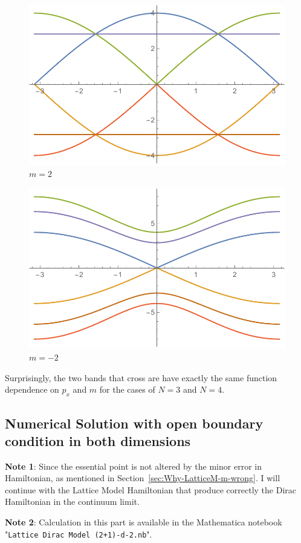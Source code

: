 \documentclass{article}
\begin{document}
\begin{figure}[H]
    \centering
    \includegraphics[width=0.6\linewidth]{pics/N8m2.pdf}
    \caption{$m=2$}
\end{figure}
\begin{figure}[H]
    \centering
    \includegraphics[width=0.6\linewidth]{pics/N8m-2.pdf}
    \caption{$m=-2$}
\end{figure}

Surprisingly, the two bands that cross are have exactly the same
function dependence on $p_x$ and $m$ for the cases of $N=3$ and
$N=4$.



{}


\printnomenclature

\subsection{Numerical Solution with open boundary condition in both
dimensions}
\label{sec:nsol-open-bc-inXY}

\textbf{Note 1}: Since the essential point is not altered by the minor
error in Hamiltonian, as mentioned in
Section~\ref{sec:Why-LatticeM-m-wrong}. I will continue with the
Lattice Model Hamiltonian that produce correctly the Dirac Hamiltonian
in the continuum limit.

\textbf{Note 2}: Calculation in this part is available in the
Mathematica notebook "\texttt{Lattice Dirac Model (2+1)-d-2.nb}".
\end{document}
